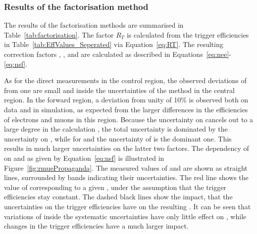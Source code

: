 \subsubsection{Results of the factorisation method}
The results of the factorisation methods are summarised in Table~\ref{tab:factorisation}. The factor $R_T$ is calculated from the trigger efficiencies in Table~\ref{tab:EffValues_Seperated} via Equation~\ref{eq:RT}. The resulting correction factors \Rsfof, \Reeof, and \Rmmof are calculated as described in Equations~\ref{eq:nee}-\ref{eq:nsf}.  

As for the direct measurements in the control region, the observed deviations of \Rsfof from one are small and inside the uncertainties of the method in the central region. In the forward region, a deviation from unity of 10\% is observed both on data and in simulation, as expected from the larger differences in the efficiencies of electrons and muons in this region. Because the uncertainty on \rmue cancels out to a large degree in the calculation \Rsfof, the total uncertainty is dominated by the uncertainty on \RT, while for \Reeof and \Rmmof the uncertainty of \rmue is the dominant one. This results in much larger uncertainties on the latter two factors. The dependency of \Rsfof on \rmue and \RT as given by Equation~\ref{eq:nsf} is illustrated in Figure~\ref{fig:rmuePropaganda}. The measured values of \rmue and \Rsfof are shown as straight lines, surrounded by bands indicating their uncertainties. The red line shows the value of \Rsfof corresponding to a given \rmue, under the assumption that the trigger efficiencies stay constant. The dashed black lines show the impact, that the uncertainties on the trigger efficiencies have on the resulting \Rsfof. It can be seen that variations of \rmue inside the systematic uncertainties have only little effect on \Rsfof, while changes in the trigger efficiencies have a much larger impact. 


